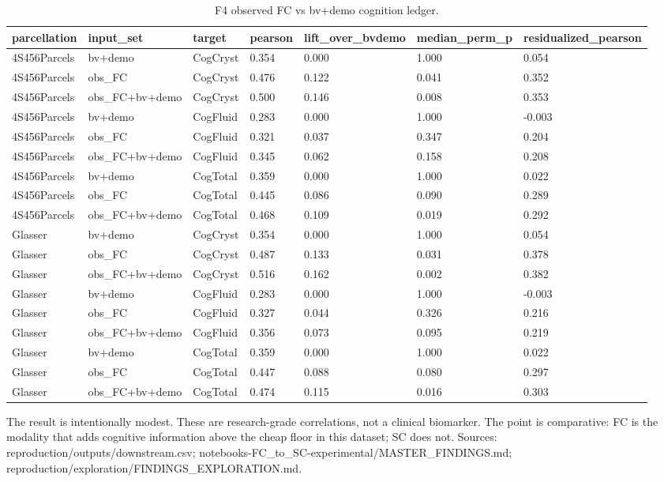 \documentclass{article}
\begin{document}
\begin{table}[H]
\centering
\scriptsize
\caption{F4 observed FC vs bv+demo cognition ledger.}
\label{tab:f4}
\begin{tabular}{lllllll}
\toprule
parcellation & input\_set & target & pearson & lift\_over\_bvdemo & median\_perm\_p & residualized\_pearson \\
\midrule
4S456Parcels & bv+demo & CogCryst & 0.354 & 0.000 & 1.000 & 0.054 \\
4S456Parcels & obs\_FC & CogCryst & 0.476 & 0.122 & 0.041 & 0.352 \\
4S456Parcels & obs\_FC+bv+demo & CogCryst & 0.500 & 0.146 & 0.008 & 0.353 \\
4S456Parcels & bv+demo & CogFluid & 0.283 & 0.000 & 1.000 & -0.003 \\
4S456Parcels & obs\_FC & CogFluid & 0.321 & 0.037 & 0.347 & 0.204 \\
4S456Parcels & obs\_FC+bv+demo & CogFluid & 0.345 & 0.062 & 0.158 & 0.208 \\
4S456Parcels & bv+demo & CogTotal & 0.359 & 0.000 & 1.000 & 0.022 \\
4S456Parcels & obs\_FC & CogTotal & 0.445 & 0.086 & 0.090 & 0.289 \\
4S456Parcels & obs\_FC+bv+demo & CogTotal & 0.468 & 0.109 & 0.019 & 0.292 \\
Glasser & bv+demo & CogCryst & 0.354 & 0.000 & 1.000 & 0.054 \\
Glasser & obs\_FC & CogCryst & 0.487 & 0.133 & 0.031 & 0.378 \\
Glasser & obs\_FC+bv+demo & CogCryst & 0.516 & 0.162 & 0.002 & 0.382 \\
Glasser & bv+demo & CogFluid & 0.283 & 0.000 & 1.000 & -0.003 \\
Glasser & obs\_FC & CogFluid & 0.327 & 0.044 & 0.326 & 0.216 \\
Glasser & obs\_FC+bv+demo & CogFluid & 0.356 & 0.073 & 0.095 & 0.219 \\
Glasser & bv+demo & CogTotal & 0.359 & 0.000 & 1.000 & 0.022 \\
Glasser & obs\_FC & CogTotal & 0.447 & 0.088 & 0.080 & 0.297 \\
Glasser & obs\_FC+bv+demo & CogTotal & 0.474 & 0.115 & 0.016 & 0.303 \\
\bottomrule
\end{tabular}
\end{table}

The result is intentionally modest. These are research-grade correlations, not a clinical
biomarker. The point is comparative: FC is the modality that adds cognitive information
above the cheap floor in this dataset; SC does not.  Sources: reproduction/outputs/downstream.csv; notebooks-FC\_to\_SC-experimental/MASTER\_FINDINGS.md; reproduction/exploration/FINDINGS\_EXPLORATION.md.
\end{document}
